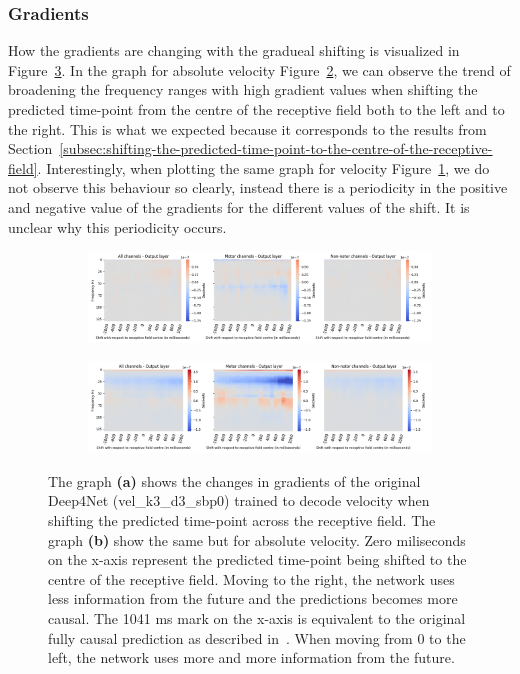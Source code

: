 \subsubsection{Gradients}\label{subsubsec:across-shiftig-gradients}
How the gradients are changing with the gradueal shifting is visualized in Figure~\ref{fig:shifting-gradients}.
In the graph for absolute velocity Figure~\ref{fig:absVel-shiftig-gradients}, we can observe the trend of broadening the frequency ranges with high gradient values when shifting the predicted time-point from the centre of the receptive field both to the left and to the right.
This is what we expected because it corresponds to the results from Section~\ref{subsec:shifting-the-predicted-time-point-to-the-centre-of-the-receptive-field}.
Interestingly, when plotting the same graph for velocity Figure~\ref{fig:vel-shifting-gradients}, we do not observe this behaviour so clearly, instead there is a periodicity in the positive and negative value of the gradients for the different values of the shift.
It is unclear why this periodicity occurs.

\begin{figure}[!hpbp]
\begin{subfigure}[a]{\textwidth}
   \includegraphics[width=1\linewidth]{img/ch4/vel-shifted-gradients}
   \caption{}
   \label{fig:vel-shifting-gradients}
\end{subfigure}

\begin{subfigure}[b]{\textwidth}
   \includegraphics[width=1\linewidth]{img/ch4/absVel-shifted-gradients}
   \caption{}
   \label{fig:absVel-shiftig-gradients}
\end{subfigure}
\caption[]{The graph \textbf{(a)} shows the changes in gradients of the original Deep4Net (vel\_k3\_d3\_sbp0) trained to decode velocity when shifting the predicted time-point across the receptive field.
The graph \textbf{(b)} show the same but for absolute velocity. Zero miliseconds on the x-axis represent the predicted time-point being shifted to the centre of the receptive field.
Moving to the right, the network uses less information from the future and the predictions becomes more causal.
The 1041 ms mark on the x-axis is equivalent to the original fully causal prediction as described in~\cite{Hammer-2021}.
When moving from 0 to the left, the network uses more and more information from the future.}
\label{fig:shifting-gradients}
\end{figure}

